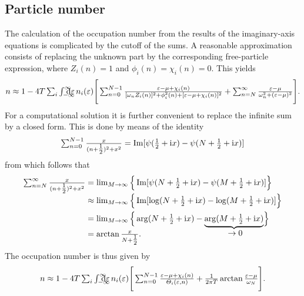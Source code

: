 \subsection{Particle number}

The calculation of the occupation number from the results of the imaginary-axis
 equations is complicated by the cutoff of the 
sums. A reasonable approximation consists of replacing the unknown part by the
corresponding free-particle expression, where $Z_i(n) = 1$ and $\phi_i(n) =
\chi_i(n) = 0$. This yields
%
\begin{equation*}
   n \approx 1 - 4 T \sum_i \int \from{-\infty} \till \infty \D \epsilon \,
   n_i(\epsilon)
   \Bigg[
      \sum_{n = 0}^{N - 1} \frac
         {\epsilon - \mu + \chi_i(n)}
         {[\omega_n Z_i(n)]^2 + \phi_i^2(n) + [\epsilon - \mu + \chi_i(n)]^2}
      + \sum_{n = N}^\infty \frac
         {\epsilon - \mu}
         {\omega_n^2 + (\epsilon - \mu)^2}
   \Bigg].
\end{equation*}
%
For a computational solution it is further convenient to replace the infinite
sum by a closed form. This is done by means of the identity
\cite[Eq.~A.14]{AllenMitrovic82}
%
\begin{equation*}
   \sum_{n = 0}^{N - 1} \frac x {(n + \tfrac 1 2)^2 + x^2}
   = \Im[\psi(\tfrac 1 2 + \I x) - \psi(N + \tfrac 1 2 + \I x)]
\end{equation*}
%
from which follows that
%
\begin{align*}
   \smash[b]{\sum_{n = N}^\infty \frac x {(n + \tfrac 1 2)^2 + x^2}}
   &= \lim_{M \rightarrow \infty}
   \Big\{
      \Im[\psi(N + \tfrac 1 2 + \I x) - \psi(M + \tfrac 1 2 + \I x)]
   \Big\}
   \\
   &\approx \lim_{M \rightarrow \infty}
   \Big\{
      \Im[\log(N + \tfrac 1 2 + \I x) - \log(M + \tfrac 1 2 + \I x)]
   \Big\}
   \\
   &= \lim_{M \rightarrow \infty}
   \Big\{
      \arg(N + \tfrac 1 2 + \I x) - \smash[b]
      {\hypo{\arg(M + \tfrac 1 2 + \I x)}{\rightarrow 0}}
   \Big\}
   \\
   &= \arctan \frac x {N + \tfrac 1 2}.
\end{align*}
%
The occupation number is thus given by
%
\begin{equation} \label{occupation number}
   n \approx 1 - 4 T \sum_i \int \from{-\infty} \till \infty \D \epsilon \,
   n_i(\epsilon)
   \Bigg[
      \sum_{n = 0}^{N - 1}
      \frac{\epsilon - \mu + \chi_i(n)}{\Theta_i(\epsilon, n)}
      + \frac 1 {2 \pi T} \arctan \frac{\epsilon - \mu}{\omega_N}
   \Bigg].
\end{equation}
